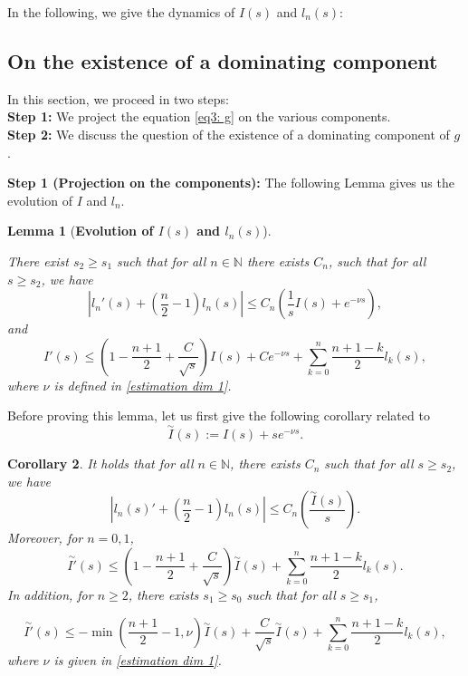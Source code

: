 \documentclass[11pt,a4paper]{article}
\newcommand{\1}{\mathbbm{1}}
\numberwithin{equation}{section}
\newcommand{\numberset}{\mathbb}
\newcommand{\N}{\numberset{N}}
\newtheorem{lemma}{Lemma}[section]
\newtheorem{cor}[lemma]{Corollary}
\theoremstyle{remark}
\begin{document}
\bigskip

In the following, we give the dynamics of $I(s)$ and $l_n(s)$:

\subsection{On the existence of a dominating component}
In this section,  we proceed in two steps:\\
\textbf{Step 1:} We project the equation \eqref{eq3: g} on the various components.\\
\textbf{Step 2:} We discuss the question of the existence of a dominating component of $g$.

\bigskip

\textbf{Step 1 (Projection on the components):} The following Lemma gives us the evolution of $I$ and $l_n$.
\begin{lemma}[\textbf{Evolution of $I(s)$ and $l_n(s)$}]\label{lemma:control of L_n with I nouveau}

There exist $s_2\geq s_1$ such that for all $n\in\N$ there exists $C_n$, such that for all $s\geq s_2$, we have
\begin{equation}\label{eq ln I}
|l_{n}'(s)+(\frac{n}{2}-1)l_{n}(s)|\leq C_n(\frac{1}{s}I(s)+e^{-\nu s}),
\end{equation}
and 
\begin{equation}\label{eq I}
I'(s)\leq (1-\frac{n+1}{2}+\frac{C}{\sqrt{s}})I(s)+Ce^{-\nu s}+\underset{k=0}{\overset{n}{\sum}}\frac{n+1-k}{2}l_{k}(s),
\end{equation}
where $\nu$ is defined in \eqref{estimation dim 1}.
\end{lemma}

Before proving this lemma, let us first give the following corollary related to 
$$\overset{\sim}{I}(s):=I(s)+se^{-\nu s}.$$
\begin{cor}\label{cor: dyn I and l tilde}
It holds that for all $n\in\N$, there exists $C_n$ such that for all $s\geq s_2$, we have
\begin{equation}\label{dyn I & l}
|l_{n}(s)'+(\frac{n}{2}-1)l_{n}(s)|\leq C_n\left(\frac{\overset{\sim}{I}(s)}{s}\right).
\end{equation}
Moreover, for $n=0,1$,
\begin{equation}\label{dyn I & l 0&1}
\overset{\sim}{I'}(s)\leq \left(1-\frac{n+1}{2}+\frac{C}{\sqrt{s}}\right)\overset{\sim}{I}(s)+\underset{k=0}{\overset{n}{\sum}}\frac{n+1-k}{2}l_{k}(s).
\end{equation}
In addition, for $n\geq 2$, there exists $s_1\geq s_0$ such that for all $s\geq s_1$,

\begin{equation}\label{dyn I & l n>1}
\overset{\sim}{I'}(s)\leq -\min\left(\frac{n+1}{2}-1,\nu\right)\overset{\sim}{I}(s)+\frac{C}{\sqrt{s}}\overset{\sim}{I}(s)+\underset{k=0}{\overset{n}{\sum}}\frac{n+1-k}{2}l_{k}(s),
\end{equation}
where $\nu$ is given in \eqref{estimation dim 1}.
\end{cor}
\end{document}
